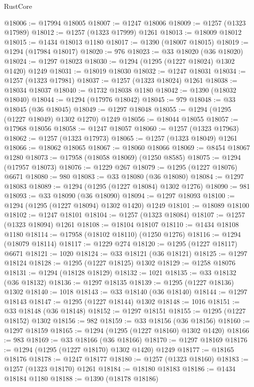 \begin{lexlean}{RustCore}
\begin{coremodule}
@18006 := @17994 @18005
@18007 := @1247 @18006
@18009 := @1257 (@1323 @17989)
@18012 := @1257 (@1323 @17999) @1261
@18013 := @18009 @18012
@18015 := @1434 @18013 @1180
@18017 := @1390 (@18007 @18015)
@18019 := @1294 (@17984 @18017)
@18020 := 976
@18023 := @33 @18020 (@36 @18020)
@18024 := @1297 @18023
@18030 := @1294 (@1295 (@1227 @18024) @1302 @1420) @1249
@18031 := @18019 @18030
@18032 := @1247 @18031
@18034 := @1257 (@1323 @17981)
@18037 := @1257 (@1323 @18024) @1261
@18038 := @18034 @18037
@18040 := @1732 @18038 @1180
@18042 := @1390 (@18032 @18040)
@18044 := @1294 (@17976 @18042)
@18045 := 979
@18048 := @33 @18045 (@36 @18045)
@18049 := @1297 @18048
@18055 := @1294 (@1295 (@1227 @18049) @1302 @1270) @1249
@18056 := @18044 @18055
@18057 := @17968 @18056
@18058 := @1247 @18057
@18060 := @1257 (@1323 @17963)
@18062 := @1257 (@1323 @17973)
@18065 := @1257 (@1323 @18049) @1261
@18066 := @18062 @18065
@18067 := @18060 @18066
@18069 := @8454 @18067 @1280
@18073 := @17958 (@18058 @18069) (@1250 @8585)
@18075 := @1294 (@17957 @18073)
@18076 := @1229 @267
@18079 := @1295 (@1227 @18076) @6671
@18080 := 980
@18083 := @33 @18080 (@36 @18080)
@18084 := @1297 @18083
@18089 := @1294 (@1295 (@1227 @18084) @1302 @1276)
@18090 := 981
@18093 := @33 @18090 (@36 @18090)
@18094 := @1297 @18093
@18100 := @1294 (@1295 (@1227 @18094) @1302 @1420) @1249
@18101 := @18089 @18100
@18102 := @1247 @18101
@18104 := @1257 (@1323 @18084)
@18107 := @1257 (@1323 @18094) @1261
@18108 := @18104 @18107
@18110 := @1434 @18108 @1180
@18114 := @17958 (@18102 @18110) (@1250 @1276)
@18116 := @1294 (@18079 @18114)
@18117 := @1229 @274
@18120 := @1295 (@1227 @18117) @6671
@18121 := 1020
@18124 := @33 @18121 (@36 @18121)
@18125 := @1297 @18124
@18128 := @1295 (@1227 @18125) @1302
@18129 := @1258 @18076
@18131 := @1294 (@18128 @18129)
@18132 := 1021
@18135 := @33 @18132 (@36 @18132)
@18136 := @1297 @18135
@18139 := @1295 (@1227 @18136) @1302
@18140 := 1018
@18143 := @33 @18140 (@36 @18140)
@18144 := @1297 @18143
@18147 := @1295 (@1227 @18144) @1302
@18148 := 1016
@18151 := @33 @18148 (@36 @18148)
@18152 := @1297 @18151
@18155 := @1295 (@1227 @18152) @1302
@18156 := 982
@18159 := @33 @18156 (@36 @18156)
@18160 := @1297 @18159
@18165 := @1294 (@1295 (@1227 @18160) @1302 @1420)
@18166 := 983
@18169 := @33 @18166 (@36 @18166)
@18170 := @1297 @18169
@18176 := @1294 (@1295 (@1227 @18170) @1302 @1420) @1249
@18177 := @18165 @18176
@18178 := @1247 @18177
@18180 := @1257 (@1323 @18160)
@18183 := @1257 (@1323 @18170) @1261
@18184 := @18180 @18183
@18186 := @1434 @18184 @1180
@18188 := @1390 (@18178 @18186)

\end{coremodule}
\end{lexlean}
